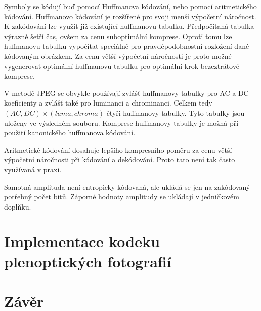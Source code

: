Symboly se kódují buď pomocí Huffmanova kódování, nebo pomocí aritmetického kódování.
Huffmanovo kódování je rozšířené pro svoji menší výpočetní náročnost.
K zakódování lze využít již existující huffmanovu tabulku.
Předpočítaná tabulka výrazně šetří čas, ovšem za cenu suboptimální komprese.
Oproti tomu lze huffmanovu tabulku vypočítat speciálně pro pravděpodobnostní rozložení dané kódovaným obrázkem.
Za cenu větší výpočetní náročnosti je proto možné vygenerovat optimální huffmanovu tabulku pro optimální krok bezeztrátové komprese.

V metodě JPEG se obvykle používají zvlášť huffmanovy tabulky pro AC a DC koeficienty a zvlášť také pro luminanci a chrominanci.
Celkem tedy $(AC, DC)\times(luma, chroma)$ čtyři huffmanovy tabulky.
Tyto tabulky jsou uloženy ve výsledném souboru.
Komprese huffmanovy tabulky je možná při použití kanonického huffmanova kódování.

Aritmetické kódování dosahuje lepšího kompresního poměru za cenu větší výpočetní náročnosti při kódování a dekódování.
Proto tato není tak často využívaná v praxi.

Samotná amplituda není entropicky kódovaná, ale ukládá se jen na zakódovaný potřebný počet bitů.
Záporné hodnoty amplitudy se ukládají v jedničkovém doplňku.

\chapter{Implementace kodeku plenoptických fotografií}
\label{lfif-impl}

\chapter{Závěr}




